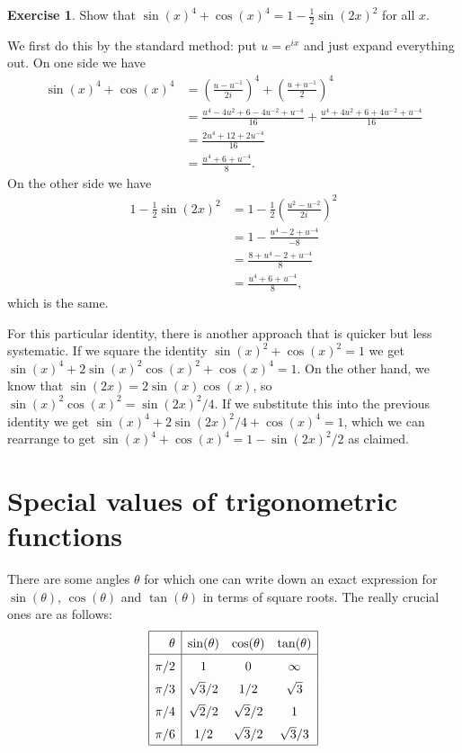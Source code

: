 \documentclass[a4paper]{book}
\newcommand{\tht}       {\theta}
\newcommand{\rr}        {\sqrt{3}}
\newcommand{\rt}        {\sqrt{2}}
\renewcommand{\:}{\colon}
\theoremstyle{definition}
\newtheorem{exercise}[theorem]{Exercise}
\renewenvironment{solution}{\SolutionInline}{\endSolutionInline}
\begin{document}
\begin{exercise}
 Show that $\sin(x)^4+\cos(x)^4=1-\frac{1}{2}\sin(2x)^2$ for all $x$.
\end{exercise}
\begin{solution}
 We first do this by the standard method: put $u=e^{ix}$ and just
 expand everything out.  On one side we have
 \begin{align*}
  \sin(x)^4+\cos(x)^4 &= 
   \left(\frac{u-u^{-1}}{2i}\right)^4 + 
   \left(\frac{u+u^{-1}}{2}\right)^4  \\
  &= \frac{u^4-4u^2+6-4u^{-2}+u^{-4}}{16} + 
     \frac{u^4+4u^2+6+4u^{-2}+u^{-4}}{16} \\
  &= \frac{2u^4+12+2u^{-4}}{16} \\
  &= \frac{u^4+6+u^{-4}}{8}. 
 \end{align*}
 On the other side we have
 \begin{align*}
  1-\frac{1}{2}\sin(2x)^2 
   &= 1 - \frac{1}{2}\left(\frac{u^2-u^{-2}}{2i}\right)^2 \\
   &= 1 - \frac{u^4-2+u^{-4}}{-8} \\
   &= \frac{8 + u^4 - 2 + u^{-4}}{8} \\
   &= \frac{u^4+6+u^{-4}}{8},
 \end{align*}
 which is the same.

 For this particular identity, there is another approach that is
 quicker but less systematic.  If we square the identity
 $\sin(x)^2+\cos(x)^2=1$ we get
 $\sin(x)^4+2\sin(x)^2\cos(x)^2+\cos(x)^4=1$.  On the other hand, we
 know that $\sin(2x)=2\sin(x)\cos(x)$, so
 $\sin(x)^2\cos(x)^2=\sin(2x)^2/4$.  If we substitute this into the
 previous identity we get $\sin(x)^4+2\sin(2x)^2/4+\cos(x)^4=1$, which
 we can rearrange to get $\sin(x)^4+\cos(x)^4=1-\sin(2x)^2/2$ as
 claimed. 
\end{solution}

\section{Special values of trigonometric functions}
\label{sec-values}

There are some angles $\tht$ for which one can write down an exact
expression for $\sin(\tht)$, $\cos(\tht)$ and $\tan(\tht)$ in terms of
square roots.  The really crucial ones are as follows:
\[ \renewcommand{\arraystretch}{1.5}
   \begin{array}{|r|ccc|}
    \hline
    \tht  & \sin(\tht)  & \cos(\tht) & \tan(\tht) \\
    \hline
    \pi/2 & 1           & 0           & \infty    \\
    \pi/3 & \rr/2       & 1/2         & \rr       \\
    \pi/4 & \rt/2       & \rt/2       & 1         \\
    \pi/6 & 1/2         & \rr/2       & \rr/3     \\
    \hline
  \end{array}
\]
\end{document}
